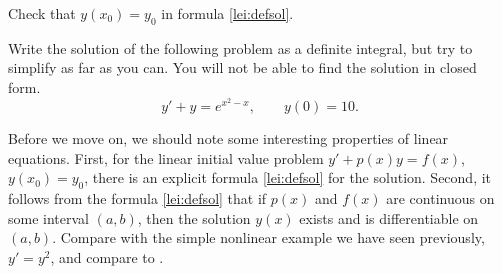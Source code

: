\begin{exercise}
Check that $y(x_0) = y_0$ in formula \eqref{lei:defsol}.
\end{exercise}

\begin{exercise}
Write the solution of the following problem
as a definite integral, but try to simplify as far as you can.  You will not
be able to find the solution in closed form.
\begin{equation*}
y' + y = e^{x^2-x}, \qquad y(0) = 10 .
\end{equation*}
\end{exercise}

\begin{remark}
Before we move on, we should note some interesting properties of linear
equations.  First, for the linear initial value problem
$y' + p(x) y = f(x)$, $y(x_0) = y_0$,
there is an explicit formula \eqref{lei:defsol} for the
solution.  Second, it follows
from the formula \eqref{lei:defsol} that if $p(x)$
and $f(x)$ are continuous on some interval $(a,b)$, then the 
solution $y(x)$ exists and is differentiable on $(a,b)$.  Compare
with the simple nonlinear example we have seen previously, $y'=y^2$,
and compare to .
\end{remark}


